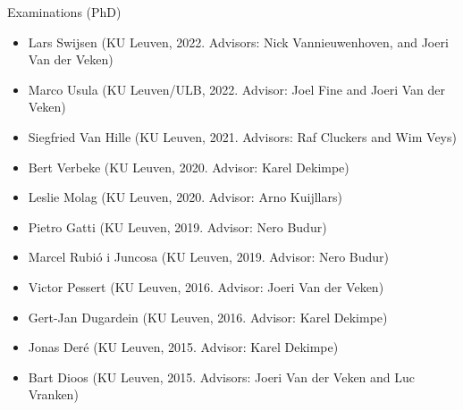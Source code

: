 \documentclass[12p]{resume}
\begin{document}
\begin{category}{Examinations (PhD)}
\begin{itemize}
\item Lars Swijsen (KU Leuven, 2022. Advisors:  Nick Vannieuwenhoven,  and Joeri Van der Veken)
\item Marco Usula (KU Leuven/ULB, 2022. Advisor:  Joel Fine and Joeri Van der Veken)
\item Siegfried Van Hille (KU Leuven, 2021. Advisors:  Raf Cluckers and Wim Veys) 
\item Bert Verbeke (KU Leuven, 2020. Advisor:  Karel Dekimpe)
\item Leslie Molag (KU Leuven, 2020. Advisor:  Arno Kuijllars)
\item Pietro Gatti (KU Leuven, 2019. Advisor:  Nero Budur)
\item Marcel Rubi\'o i Juncosa (KU Leuven, 2019. Advisor:  Nero Budur)
\item Victor Pessert (KU Leuven, 2016. Advisor:  Joeri Van der Veken)
\item Gert-Jan Dugardein (KU Leuven, 2016. Advisor:  Karel Dekimpe)
\item Jonas Der\'e (KU Leuven, 2015. Advisor:  Karel Dekimpe)
\item Bart Dioos (KU Leuven, 2015. Advisors: Joeri Van der Veken and Luc Vranken)
\end{itemize}
 



\end{category}
\end{document}
